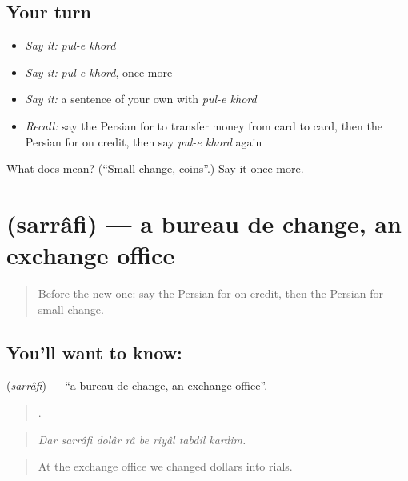 \subsection*{Your turn}
\begin{itemize}
\raggedright
  \item \emph{Say it:} \emph{pul-e khord}
  \item \emph{Say it:} \emph{pul-e khord}, once more
  \item \emph{Say it:} a sentence of your own with \emph{pul-e khord}
  \item \emph{Recall:} say the Persian for to transfer money from card to card, then the Persian for on credit, then say \emph{pul-e khord} again
\end{itemize}

\begin{tcolorbox}[breakable,colback=teal!4,colframe=teal!35!black,title={Before you move on}]
What does   mean? (\textquotedblleft{}Small change, coins\textquotedblright{}.) Say it once more.
\end{tcolorbox}
\section[\texorpdfstring{\fa{صرافی} (sarrâfi)}{صرافی (sarrâfi)}]{ (sarrâfi) — a bureau de change, an exchange office}

\label{lesson:FA-C461-sarrafi}



\begin{quote}
Before the new one: say the Persian for on credit, then the Persian for small change.
\end{quote}

\subsection*{You'll want to know: }
\textbf{} (\emph{sarrâfi}) — \textquotedblleft{}a bureau de change, an exchange office\textquotedblright{}.

\begin{quote}
       .
\end{quote}

\begin{quote}
\emph{Dar sarrâfi dolâr râ be riyâl tabdil kardim.}
\end{quote}

\begin{quote}
At the exchange office we changed dollars into rials.
\end{quote}

